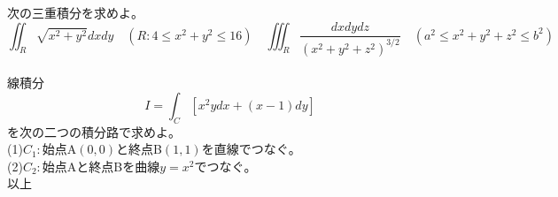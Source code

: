 \documentclass[a4j,dvipdfmx]{jsarticle}
\begin{document}
次の三重積分を求めよ。
\begin{equation*}
    \iint_R\sqrt{x^2+y^2}dxdy\quad(R:4\leq x^2+y^2\leq 16)\quad\iiint_R\frac{dxdydz}{(x^2+y^2+z^2)^{3/2}}\quad(a^2\leq x^2+y^2+z^2\leq b^2)
\end{equation*}
\\

線積分
\begin{equation*}
    I=\int_C[x^2ydx+(x-1)dy]
\end{equation*}
を次の二つの積分路で求めよ。\\
(1)$C_1:$始点A$(0,0)$と終点B$(1,1)$を直線でつなぐ。\\
(2)$C_2:$始点Aと終点Bを曲線$y=x^2$でつなぐ。\\
以上
\end{document}
